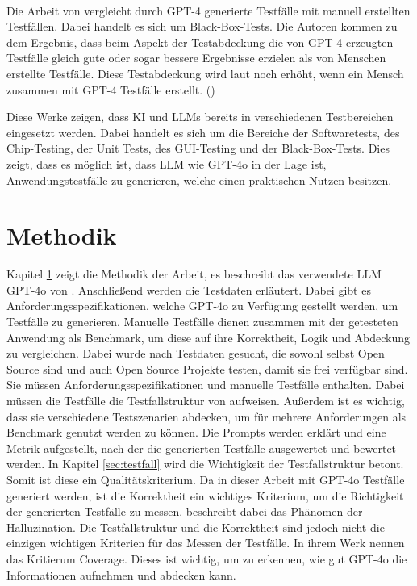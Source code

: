 \documentclass[12pt,toc=bib,toc=listof]{scrreprt}
\begin{document}
\\
Die Arbeit von \textcite{Kirinuki2024} vergleicht durch GPT-4 generierte Testfälle mit manuell erstellten Testfällen. Dabei handelt es sich um Black-Box-Tests. Die Autoren \textcite{Kirinuki2024} kommen zu dem Ergebnis, dass beim Aspekt der Testabdeckung die von GPT-4 erzeugten Testfälle gleich gute oder sogar bessere Ergebnisse erzielen als von Menschen erstellte Testfälle. Diese Testabdeckung wird laut \textcite{Kirinuki2024} noch erhöht, wenn ein Mensch zusammen mit GPT-4 Testfälle erstellt. (\cite{Kirinuki2024})
\newpage

\noindent Diese Werke zeigen, dass KI und LLMs bereits in verschiedenen Testbereichen eingesetzt werden. Dabei handelt es sich um die Bereiche der Softwaretests, des Chip-Testing, der Unit Tests, des GUI-Testing und der Black-Box-Tests. Dies zeigt, dass es möglich ist, dass LLM wie GPT-4o in der Lage ist, Anwendungstestfälle zu generieren, welche einen praktischen Nutzen besitzen.

\chapter{Methodik} %
\label{sec:methodik}
Kapitel \ref{sec:methodik} zeigt die Methodik der Arbeit, es beschreibt das verwendete LLM GPT-4o von \textcite{OpenAI2025}. Anschließend werden die Testdaten erläutert. Dabei gibt es Anforderungsspezifikationen, welche GPT-4o zu Verfügung gestellt werden, um Testfälle zu generieren. Manuelle Testfälle dienen zusammen mit der getesteten Anwendung als Benchmark, um diese auf ihre Korrektheit, Logik und Abdeckung zu vergleichen. Dabei wurde nach Testdaten gesucht, die sowohl selbst Open Source sind und auch Open Source Projekte testen, damit sie frei verfügbar sind. Sie müssen Anforderungsspezifikationen und manuelle Testfälle enthalten. Dabei müssen die Testfälle die Testfallstruktur von \textcite{IsoIecIeee2024} aufweisen. Außerdem ist es wichtig, dass sie verschiedene Testszenarien abdecken, um für mehrere Anforderungen als Benchmark genutzt werden zu können. Die Prompts werden erklärt und eine Metrik aufgestellt, nach der die generierten Testfälle ausgewertet und bewertet werden. In Kapitel \ref{sec:testfall} wird die Wichtigkeit der Testfallstruktur betont. Somit ist diese ein Qualitätskriterium. Da in dieser Arbeit mit GPT-4o Testfälle generiert werden, ist die Korrektheit ein wichtiges Kriterium, um die Richtigkeit der generierten Testfälle zu messen. \textcite{Li2024} beschreibt dabei das Phänomen der Halluzination. Die Testfallstruktur und die Korrektheit sind jedoch nicht die einzigen wichtigen Kriterien für das Messen der Testfälle. In ihrem Werk nennen \textcite{Tran2025} das Kritierum Coverage. Dieses ist wichtig, um zu erkennen, wie gut GPT-4o die Informationen aufnehmen und abdecken kann.
\end{document}
